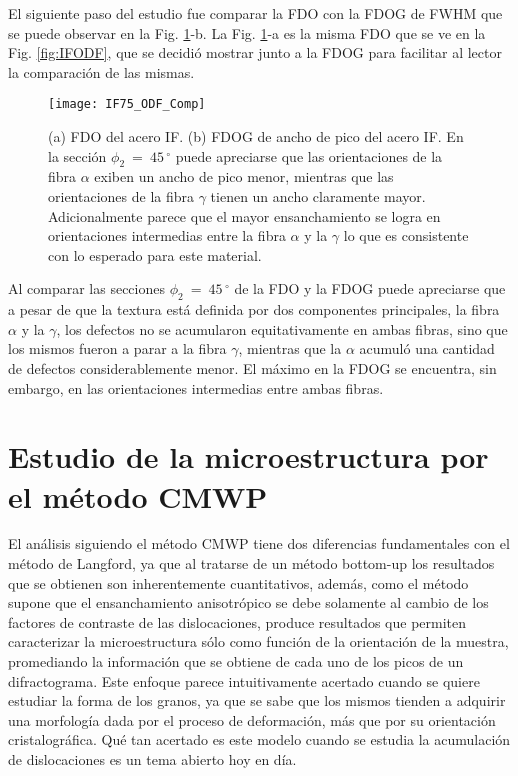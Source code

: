 El siguiente paso del estudio fue comparar la FDO con la FDOG de FWHM que se puede observar en la Fig. \ref{fig:IFODFComp}-b.
La Fig. \ref{fig:IFODFComp}-a es la misma FDO que se ve en la Fig. \ref{fig:IFODF}, que se decidió mostrar junto a la FDOG para facilitar al lector la comparación de las mismas.
\begin{figure}[!htb]
  \centering
  \texttt{[image: IF75\_ODF\_Comp]}
  \caption{(a) FDO del acero IF. (b) FDOG de ancho de pico del acero IF. En la sección $\phi_2 \ = \ 45$\,$^{\circ}$ puede apreciarse que las orientaciones de la fibra $\alpha$ exiben un ancho de pico menor, mientras que las orientaciones de la fibra $\gamma$ tienen un ancho claramente mayor. Adicionalmente parece que el mayor ensanchamiento se logra en orientaciones intermedias entre la fibra $\alpha$ y la $\gamma$ lo que es consistente con lo esperado para este material.}
  \label{fig:IFODFComp}
\end{figure}

Al comparar las secciones $\phi_2 \ = \ 45$\,$^{\circ}$ de la FDO y la FDOG puede apreciarse que a pesar de que la textura está definida por dos componentes principales, la fibra $\alpha$ y  la $\gamma$, los defectos no se acumularon equitativamente en ambas fibras, sino que los mismos fueron a parar a la fibra $\gamma$, mientras que la $\alpha$ acumuló una cantidad de defectos considerablemente menor.
El máximo en la FDOG se encuentra, sin embargo, en las orientaciones intermedias entre ambas fibras.

\section{Estudio de la microestructura por el método CMWP}\label{S:IFCMWP}
El análisis siguiendo el método CMWP tiene dos diferencias fundamentales con el método de Langford, ya que al tratarse de un método bottom-up los resultados que se obtienen son inherentemente cuantitativos, además, como el método supone que el ensanchamiento anisotrópico se debe solamente al cambio de los factores de contraste de las dislocaciones, produce resultados que permiten caracterizar la microestructura sólo como función de la orientación de la muestra, promediando la información que se obtiene de cada uno de los picos de un difractograma. 
Este enfoque parece intuitivamente acertado cuando se quiere estudiar la forma de los granos, ya que se sabe que los mismos tienden a adquirir una morfología dada por el proceso de deformación, más que por su orientación cristalográfica.
Qué tan acertado es este modelo cuando se estudia la acumulación de dislocaciones es un tema abierto hoy en día.

